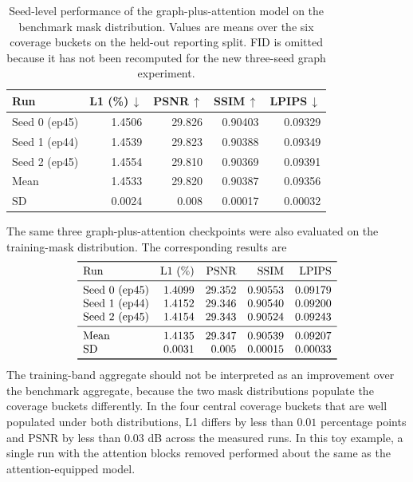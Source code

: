 \documentclass[12pt]{article}
\begin{document}
\begin{table}[H]
\centering
\small
\setlength{\tabcolsep}{5pt}
\renewcommand{\arraystretch}{1.08}
\begin{tabular}{@{}lrrrr@{}}
\toprule
Run
& L1 (\%)\,$\downarrow$
& PSNR\,$\uparrow$
& SSIM\,$\uparrow$
& LPIPS\,$\downarrow$\\
\midrule
Seed 0 (ep45)
& 1.4506 & 29.826 & 0.90403 & 0.09329\\
Seed 1 (ep44)
& 1.4539 & 29.823 & 0.90388 & 0.09349\\
Seed 2 (ep45)
& 1.4554 & 29.810 & 0.90369 & 0.09391\\
\midrule
Mean
& 1.4533 & 29.820 & 0.90387 & 0.09356\\
SD
& 0.0024 & 0.008 & 0.00017 & 0.00032\\
\bottomrule
\end{tabular}
\caption{Seed-level performance of the graph-plus-attention model on the
benchmark mask distribution. Values are means over the six coverage buckets
on the held-out reporting split. FID is omitted because it has not been
recomputed for the new three-seed graph experiment.}
\label{tab:inpainting-graph-seeds}
\end{table}

The same three graph-plus-attention checkpoints were also evaluated on the
training-mask distribution. The corresponding results are
\[
\begin{array}{lrrrr}
\toprule
\text{Run}
& \text{L1 (\%)}
& \text{PSNR}
& \text{SSIM}
& \text{LPIPS}\\
\midrule
\text{Seed 0 (ep45)}
&1.4099&29.352&0.90553&0.09179\\
\text{Seed 1 (ep44)}
&1.4152&29.346&0.90540&0.09200\\
\text{Seed 2 (ep45)}
&1.4154&29.343&0.90524&0.09243\\
\midrule
\text{Mean}
&1.4135&29.347&0.90539&0.09207\\
\text{SD}
&0.0031&0.005&0.00015&0.00033\\
\bottomrule
\end{array}
\]
The training-band aggregate should not be interpreted as an improvement over
the benchmark aggregate, because the two mask distributions populate the
coverage buckets differently. In the four central coverage buckets that are
well populated under both distributions, L1 differs by less than \(0.01\)
percentage points and PSNR by less than \(0.03\) dB across the measured runs.
In this toy example, a single run with the attention blocks removed
performed about the same as the attention-equipped model.
\end{document}
